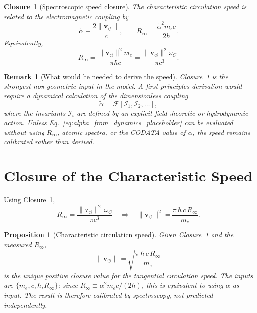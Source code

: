 \documentclass[aps,pra,preprint,longbibliography,nofootinbib]{revtex4-2}
\newtheorem{proposition}{Proposition}
\newtheorem{remark}{Remark}
\newtheorem{closure}{Closure}
\newcommand{\vnorm}{\lVert\mathbf{v}_{\!\boldsymbol{\circlearrowleft}}\rVert} %
\newcommand{\omC}{\omega_C}                      %
\newcommand{\Rinf}{R_\infty}                     %
\begin{document}
\begin{closure}[Spectroscopic speed closure]
\label{cl:speed}
The characteristic circulation speed is related to the electromagnetic
coupling by
\begin{equation}
  \tilde\alpha \equiv \frac{2\vnorm}{c},
  \qquad
  R_\infty = \frac{\tilde\alpha^2 m_e c}{2h}.
  \label{eq:speed_closure}
\end{equation}
Equivalently,
\begin{equation}
  R_\infty = \frac{\vnorm^2 m_e}{\pi\hbar c}
           = \frac{\vnorm^2\omega_C}{\pi c^3}.
  \label{eq:rydberg_core}
\end{equation}
\end{closure}

\begin{remark}[What would be needed to derive the speed]
\label{rem:derive_speed}
Closure~\ref{cl:speed} is the strongest non-geometric input in the
model.  A first-principles derivation would require a dynamical
calculation of the dimensionless coupling
\begin{equation}
  \tilde\alpha = \mathcal{F}[\mathcal{I}_1,\mathcal{I}_2,\ldots],
  \label{eq:alpha_from_dynamics_placeholder}
\end{equation}
where the invariants $\mathcal{I}_i$ are defined by an explicit
field-theoretic or hydrodynamic action.  Unless Eq.~\eqref{eq:alpha_from_dynamics_placeholder}
can be evaluated without using $R_\infty$, atomic spectra, or the
CODATA value of $\alpha$, the speed remains calibrated rather than
derived.
\end{remark}

\section{Closure of the Characteristic Speed}
\label{sec:derivation}

Using Closure~\ref{cl:speed},
\begin{equation}
  \Rinf = \frac{\vnorm^2\,\omC}{\pi c^3}
  \quad\Longrightarrow\quad
  \vnorm^2 = \frac{\pi\,\hbar\,c\,\Rinf}{m_e}.
  \label{eq:vc_solve}
\end{equation}

\begin{proposition}[Characteristic circulation speed]
\label{prop:vc}
Given Closure~\ref{cl:speed} and the measured $\Rinf$,
\begin{equation}
  \boxed{
    \vnorm = \sqrt{\frac{\pi\,\hbar\,c\,\Rinf}{m_e}}
  }
  \label{eq:vc}
\end{equation}
is the unique positive closure value for the tangential
circulation speed.
The inputs are $\{m_e, c, \hbar, \Rinf\}$; since
$\Rinf \equiv \alpha^2 m_e c/(2h)$, this is equivalent to using
$\alpha$ as input.  The result is therefore calibrated by spectroscopy,
not predicted independently.
\end{proposition}
\end{document}
